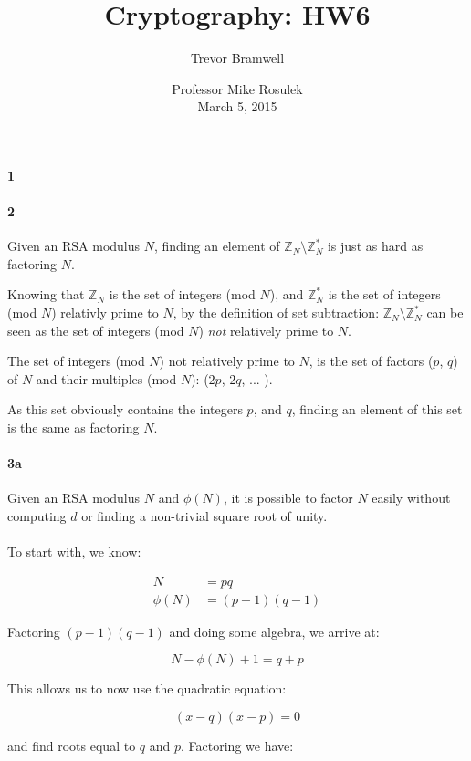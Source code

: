 \documentclass[12pt]{article}
\title{Cryptography: HW6}
\author{Trevor Bramwell}
\date{
    Professor Mike Rosulek\\
    March 5, 2015
}
\begin{document}
\maketitle


\paragraph{1} 

\paragraph{2}

Given an RSA modulus $N$, finding an element of $\mathbb{Z}_N \setminus
\mathbb{Z}_{N}^*$ is just as hard as factoring $N$.

Knowing that $\mathbb{Z}_N$ is the set of integers (mod $N$), and
$\mathbb{Z}_{N}^*$ is the set of integers (mod $N$) relativly prime to
$N$, by the definition of set subtraction: $\mathbb{Z}_N \setminus
\mathbb{Z}_{N}^*$ can be seen as the set of integers (mod $N$) {\it not}
relatively prime to $N$.

The set of integers (mod $N$) not relatively prime to $N$, is the set of
factors ($p$, $q$) of $N$ and their multiples (mod $N$): ($2p$, $2q$, ... ).

As this set obviously contains the integers $p$, and $q$, finding an
element of this set is the same as factoring $N$.

\paragraph{3a}

Given an RSA modulus $N$ and $\phi{(N)}$, it is possible to factor $N$
easily without computing $d$ or finding a non-trivial square root of
unity.
\\\\
To start with, we know:

\begin{align*}
    N &= pq \\
    \phi{(N)} &= (p - 1)(q - 1)
\end{align*}

Factoring $(p - 1)(q - 1)$ and doing some algebra, we arrive at:

\[
    N - \phi{(N)} + 1 = q + p
\]

This allows us to now use the quadratic equation:

\[
    (x - q)(x - p) = 0
\]

and find roots equal to $q$ and $p$. Factoring we have:
\end{document}
